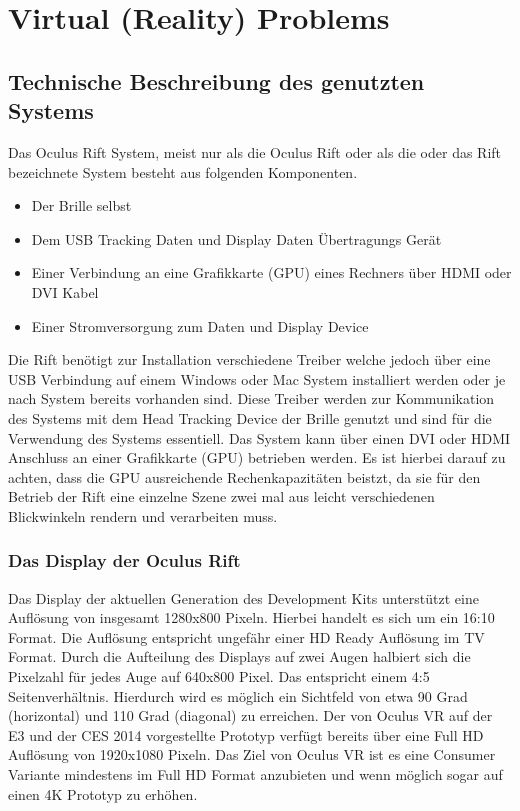 \documentclass[pagesize, paper=a4, fontsize=12pt,titlepage=true, headings=small, headnosepline, abstractoff, liststotoc, nochapterprefix, plainheadsepline, twoside]{scrreprt}
\begin{document}



\chapter{Virtual (Reality) Problems}
\section{Technische Beschreibung des genutzten Systems}
Das Oculus Rift System, meist nur als die Oculus Rift oder als die oder das Rift bezeichnete System besteht aus folgenden Komponenten.
\begin{itemize}
\item Der Brille selbst
\item Dem USB Tracking Daten und Display Daten Übertragungs Gerät
\item Einer Verbindung an eine Grafikkarte (GPU) eines Rechners über HDMI oder DVI Kabel
\item Einer Stromversorgung zum Daten und Display Device
\end{itemize}
Die Rift benötigt zur Installation verschiedene Treiber welche jedoch über eine USB Verbindung auf einem Windows oder Mac System installiert werden oder je nach System bereits vorhanden sind. Diese Treiber werden zur Kommunikation des Systems mit dem Head Tracking Device der Brille genutzt und sind für die Verwendung des Systems essentiell. Das System kann über einen DVI oder HDMI Anschluss an einer Grafikkarte (GPU) betrieben werden. Es ist hierbei darauf zu achten, dass die GPU ausreichende Rechenkapazitäten beistzt, da sie für den Betrieb der Rift eine einzelne Szene zwei mal aus leicht verschiedenen Blickwinkeln rendern und verarbeiten muss.

\subsection{Das Display der Oculus Rift}
Das Display der aktuellen Generation des Development Kits unterstützt eine Auflösung von insgesamt 1280x800 Pixeln. Hierbei handelt es sich um ein 16:10 Format. Die Auflösung entspricht ungefähr einer HD Ready Auflösung im TV Format. Durch die Aufteilung des Displays auf zwei Augen halbiert sich die Pixelzahl für jedes Auge auf 640x800 Pixel. Das entspricht einem 4:5 Seitenverhältnis. Hierdurch wird es möglich ein Sichtfeld von etwa 90 Grad (horizontal) und 110 Grad (diagonal) zu erreichen. Der von Oculus VR auf der E3 und der CES 2014 vorgestellte Prototyp verfügt bereits über eine Full HD Auflösung von 1920x1080 Pixeln. Das Ziel von Oculus VR ist es eine Consumer Variante mindestens im Full HD Format anzubieten und wenn möglich sogar auf einen 4K Prototyp zu erhöhen.
\end{document}
